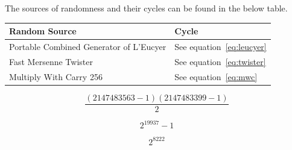 The sources of randomness and their cycles can be found in the below table.

\vspace{0.7cm}

\begin{adjustbox}{center}
    \begin{tabular}{l l}
    \toprule
    Random Source                                                   & Cycle                         \\
    \midrule

    Portable Combined Generator of L'Eucyer \parencite{leucyer1988} & See equation~\ref{eq:leucyer} \\ \addlinespace

    Fast Mersenne Twister \parencite{matsumoto1998,saito2008}       & See equation~\ref{eq:twister} \\ \addlinespace

    Multiply With Carry 256 \parencite{marsaglia2003}               & See equation~\ref{eq:mwc}     \\

    \bottomrule
    \end{tabular}
\end{adjustbox}

\vspace{0.7cm}

\begin{equation} \label{eq:leucyer}
\frac{(2147483563-1)(2147483399-1)}{2}
\end{equation}

\begin{equation} \label{eq:twister}
{2}^{19937}-1
\end{equation}

\begin{equation} \label{eq:mwc}
{2}^{8222}
\end{equation}
